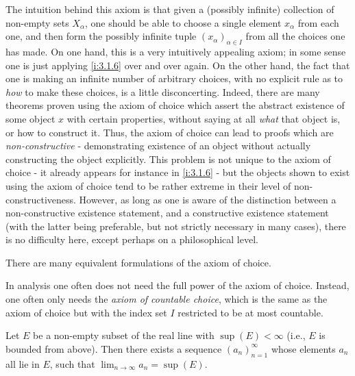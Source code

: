 \begin{rmk}\label{i:8.4.3}
  The intuition behind this axiom is that given a (possibly infinite) collection of non-empty sets \(X_{\alpha}\), one should be able to choose a single element \(x_{\alpha}\) from each one, and then form the possibly infinite tuple \((x_{\alpha})_{\alpha \in I}\) from all the choices one has made.
  On one hand, this is a very intuitively appealing axiom;
  in some sense one is just applying \cref{i:3.1.6} over and over again.
  On the other hand, the fact that one is making an infinite number of arbitrary choices, with no explicit rule as to \emph{how} to make these choices, is a little disconcerting.
  Indeed, there are many theorems proven using the axiom of choice which assert the abstract existence of some object \(x\) with certain properties, without saying at all \emph{what} that object is, or how to construct it.
  Thus, the axiom of choice can lead to proofs which are \emph{non-constructive} - demonstrating existence of an object without actually constructing the object explicitly.
  This problem is not unique to the axiom of choice - it already appears for instance in \cref{i:3.1.6} - but the objects shown to exist using the axiom of choice tend to be rather extreme in their level of non-constructiveness.
  However, as long as one is aware of the distinction between a non-constructive existence statement, and a constructive existence statement (with the latter being preferable, but not strictly necessary in many cases), there is no difficulty here, except perhaps on a philosophical level.
\end{rmk}

\begin{rmk}\label{i:8.4.4}
  There are many equivalent formulations of the axiom of choice.
\end{rmk}

\begin{note}
  In analysis one often does not need the full power of the axiom of choice.
  Instead, one often only needs the \emph{axiom of countable choice}, which is the same as the axiom of choice but with the index set \(I\) restricted to be at most countable.
\end{note}

\begin{lem}\label{i:8.4.5}
  Let \(E\) be a non-empty subset of the real line with \(\sup(E) < \infty\)
  (i.e., \(E\) is bounded from above).
  Then there exists a sequence \((a_n)_{n = 1}^\infty\) whose elements \(a_n\) all lie in \(E\), such that \(\lim_{n \to \infty} a_n = \sup(E)\).
\end{lem}

